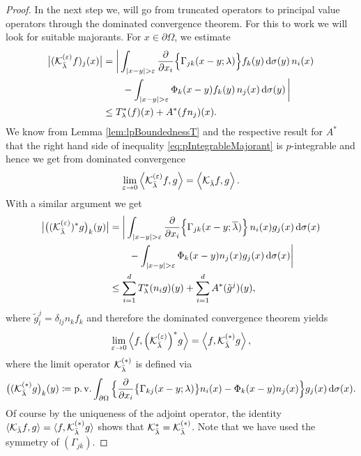 \begin{proof}
  In the next step we, will go from truncated operators to principal value operators through the dominated convergence theorem. 
  For this to work we will look for suitable majorants.
  For $x \in \partial\Omega$, we estimate
  \begin{align}
    \big|(\mathcal{K}_{\bar\lambda}^{(\varepsilon)}f)_j (x)\big|
    &= \bigg| \int_{|x - y| > \varepsilon} \frac{\partial}{\partial x_i} \Big\{ \Gamma_{jk}(x - y; \lambda) \Big\} f_k(y) \, {\operatorname{d}\!{\sigma}}(y) \, n_i(x)  \nonumber\\
    &\qquad - \int_{|x - y| > \varepsilon} \Phi_k(x - y) f_k(y)\, n_j(x) \, {\operatorname{d}\!{\sigma}}(y)\, \bigg| \nonumber\\
    \label{eq:pIntegrableMajorant}
    &\leq T_\lambda^*(f)(x) + A^*(fn_j)(x).
  \end{align}
  We know from Lemma \ref{lem:lpBoundednessT} and the respective result for $A^*$ that the right hand side of inequality \eqref{eq:pIntegrableMajorant} is $p$-integrable and hence we get from dominated convergence
  \begin{align*}
    \lim_{\varepsilon \to 0} \Big\langle \mathcal{K}_{\bar\lambda}^{(\varepsilon)} f, g \Big\rangle = \Big\langle \mathcal{K}_{\bar\lambda} f, g \Big\rangle\,.
  \end{align*}
  With a similar argument we get
  \begin{align*}
    \big| \big((\mathcal{K}_{\bar \lambda}^{(\varepsilon)})^* g \big)_k(y) \big|
    &=
    \bigg| \int_{|x - y| > \varepsilon} \frac{\partial}{\partial x_i} \Big\{ \Gamma_{jk}(x - y; \overline\lambda) \Big\} \, n_i(x) g_j(x) \, {\operatorname{d}\!{\sigma}}(x)\\
    &\qquad - \int_{|x - y| > \varepsilon} \Phi_k(x - y) n_j(x) g_j(x)   \, {\operatorname{d}\!{\sigma}}(x) \bigg| \\
    &\leq \sum_{i = 1}^d T_\lambda^*(n_i g)(y)  + \sum_{i = 1}^d A^*(\tilde g^j)(y),
  \end{align*}
  where $\tilde g^j_l = \delta_{lj} n_k f_k$ and therefore the dominated convergence theorem yields
  \begin{align*}
    \lim_{\varepsilon \to 0} \Big\langle f, {\Big(\mathcal{K}_{\bar\lambda}^{(\varepsilon)}}\Big)^* g \Big\rangle = \Big\langle f,\mathcal{K}_{\bar\lambda}^{(*)}  g \Big\rangle\,,
  \end{align*}
  where the limit operator $\mathcal{K}_{\bar\lambda}^{(*)}$ is defined via
  \begin{align*}
    \big( ( \mathcal{K}_{\bar\lambda}^{(*)} g\big)_k(y)
    \coloneqq \operatorname{p. v.}\int_{\partial\Omega} \Big\{ \frac{\partial}{\partial x_i} \big\{ \Gamma_{kj}(x - y; \lambda)\big\} n_i(x) - \Phi_k(x - y) n_j(x) \Big\} g_j(x) \, {\operatorname{d}\!{\sigma}}(x). 
  \end{align*}
  Of course by the uniqueness of the adjoint operator, the identity $\langle \mathcal{K}_{\bar\lambda} f, g \rangle = \langle f, \mathcal{K}_{\bar\lambda}^{(*)} g \rangle$ shows that $\mathcal{K}_{\bar\lambda}^* = \mathcal{K}_{\bar\lambda}^{(*)}$.
  Note that we have used the symmetry of $(\Gamma_{jk})$.


\end{proof}
